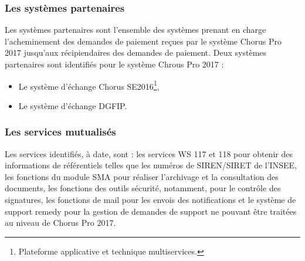 \documentclass[12pt,a4paper]{article}
\begin{document}
\subsubsection{Les systèmes partenaires}
Les systèmes partenaires sont l’ensemble des systèmes prenant en charge l’acheminement des demandes de paiement reçues par le système Chorus Pro 2017 jusqu’aux récipiendaires des demandes de paiement. Deux systèmes partenaires sont identifiés pour le système Chrous Pro 2017 :
\begin{itemize}
\item	Le système d’échange Chorus SE2016\footnote{Plateforme applicative et technique multiservices.},
\item	Le système d’échange DGFIP.
\end{itemize}
\subsubsection{Les services mutualisés}
Les services identifiés, à date, sont : les services WS 117 et 118 pour obtenir des informations de référentiels telles que les numéros de SIREN/SIRET de l’INSEE, les fonctions du module SMA pour réaliser l’archivage et la consultation des documents, les fonctions des outils sécurité, notamment, pour le contrôle des signatures, les fonctions de mail pour les envois des notifications et le système de support remedy pour la gestion de demandes de support ne pouvant être traitées au niveau de Chorus Pro 2017. 
\clearpage
\newpage
\end{document}
